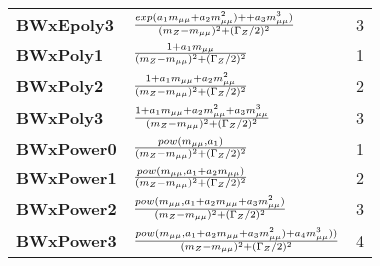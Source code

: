 \documentclass[xcolor={x11names}]{beamer}
\begin{document}
\begin{frame}[fragile,shrink=25]
\begin{table}
{\begin{tabular}{l l c}
\textbf{BWxEpoly3}      &    $\frac{exp(a\sb 1 m\sb {\mu\mu} + a\sb 2m\sb {\mu\mu}^2) + + a\sb 3m\sb {\mu\mu}^3)}{(m\sb Z -m\sb {\mu\mu})^2 + (\Gamma\sb Z/2)^2}                 $   &   3       \\
\textbf{BWxPoly1 }      &    $\frac{1+a\sb 1 m\sb {\mu\mu}}{(m\sb Z -m\sb {\mu\mu})^2 + (\Gamma\sb Z/2)^2}                                                           $   &   1       \\
\textbf{BWxPoly2 }      &    $\frac{1+a\sb 1 m\sb {\mu\mu} + a\sb 2m\sb {\mu\mu}^2}{(m\sb Z -m\sb {\mu\mu})^2 + (\Gamma\sb Z/2)^2}                                         $   &   2       \\
\textbf{BWxPoly3 }      &    $\frac{1+a\sb 1 m\sb {\mu\mu} + a\sb 2m\sb {\mu\mu}^2 + a\sb 3m\sb {\mu\mu}^3}{(m\sb Z -m\sb {\mu\mu})^2 + (\Gamma\sb Z/2)^2}                       $   &   3       \\
\textbf{BWxPower0}      &    $\frac{pow(m\sb {\mu\mu}, a\sb 1 )}{(m\sb Z -m\sb {\mu\mu})^2 + (\Gamma\sb Z/2)^2}                                                      $   &   1       \\
\textbf{BWxPower1}      &    $\frac{pow(m\sb {\mu\mu}, a\sb 1 + a\sb 2 m\sb {\mu\mu})}{(m\sb Z -m\sb {\mu\mu})^2 + (\Gamma\sb Z/2)^2}                                      $   &   2       \\
\textbf{BWxPower2}      &    $\frac{pow(m\sb {\mu\mu}, a\sb 1 + a\sb 2 m\sb {\mu\mu}+ a\sb 3 m\sb {\mu\mu}^2)}{(m\sb Z -m\sb {\mu\mu})^2 + (\Gamma\sb Z/2)^2}                    $   &   3       \\
\textbf{BWxPower3}      &    $\frac{pow(m\sb {\mu\mu}, a\sb 1 + a\sb 2 m\sb {\mu\mu}+ a\sb 3 m\sb {\mu\mu}^2)+ a\sb 4 m\sb {\mu\mu}^3))}{(m\sb Z -m\sb {\mu\mu})^2 + (\Gamma\sb Z/2)^2}$   &   4       \\

\end{tabular}
}

\end{table}

\end{frame}





\end{document}
